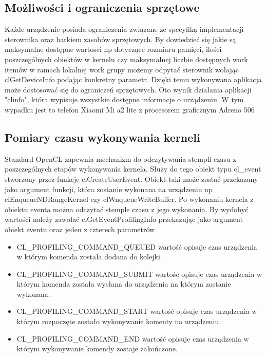 \subsection{Możliwości i ograniczenia sprzętowe}
Każde urządzenie posiada ograniczenia związane ze specyfiką implementacji sterownika oraz barkiem zasobów sprzętowych. By dowiedzieć się jakie są maksymalne dostępne wartosci np dotyczące rozmiaru pamięci, ilości poszczególnych obiektów w kernelu czy maksymalnej liczbie dostępnych work itemów w ramach lokalnej work grupy możemy odpytać sterownik wołając clGetDeviceInfo podając konkretny parametr. Dzięki temu wykonywana aplikacja może dostosować się do ograniczeń sprzętowych. Oto wynik działania aplikacji "clinfo", która wypisuje wszystkie dostępne informacje o urządzeniu. W tym wypadku jest to telefon Xiaomi Mi a2 lite z procesorem graficznym Adreno 506
 
 \subsection{Pomiary czasu wykonywania kerneli}
 Standard OpenCL zapewnia mechanizm do odczytywania stempli czasu z poszczególnych etapów wykonywania kernela. Służy do tego obiekt typu cl\_event stworzony przez funkcje clCreateUserEvent. Obiekt taki może zostać przekazany jako argument funkcji, która zostanie wykonana na urządzeniu np clEnqueueNDRangeKernel czy clWnqueueWriteBuffer.
 Po wykonaniu kernela z obiektu eventa można odczytać stemple czasu z jego wykonania. By wydobyć wartości należy zawołać clGetEventProfilingInfo przekazując jako argument obiekt eventu oraz jeden z czterech parametrów 
 \begin{itemize}
     \item CL\_PROFILING\_COMMAND\_QUEUED wartość opisuje czas urządzenia w którym komenda została dodana do kolejki.
     \item CL\_PROFILING\_COMMAND\_SUBMIT wartośc opisuje czas urządzenia w którym komenda została wysłana do urządzenia na którym zostanie wykonana.
     \item CL\_PROFILING\_COMMAND\_START wartość opisuje czas urządzenia w którym rozpoczęte zostało wykonywanie komenty na urządzeniu.
     \item CL\_PROFILING\_COMMAND\_END wartość opisuje czas urządzenia w którym wykonywanie komendy zostaje zakończone.
\end{itemize}
